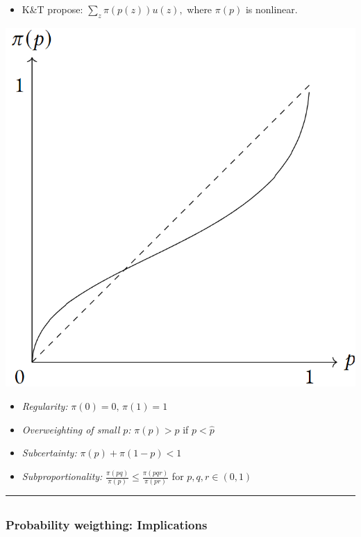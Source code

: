 \documentclass[
  letterpaper,
  DIV=11,
  numbers=noendperiod]{scrartcl}
\providecommand{\tightlist}{%
  \setlength{\itemsep}{0pt}\setlength{\parskip}{0pt}}\usepackage{longtable,booktabs,array}
\begin{document}
\begin{itemize}
\tightlist
\item
  K\&T propose: \(\sum_z\pi(p(z))u(z),\) where \(\pi(p)\) is nonlinear.
\end{itemize}

\includegraphics[width=0.85\linewidth,height=\textheight,keepaspectratio]{figures/WeightingFunction.png}

\begin{itemize}
\tightlist
\item
  \emph{Regularity:} \(\scriptstyle \pi(0) = 0,\,\pi(1) = 1\)
\item
  \emph{Overweighting of small \(p\):} \(\pi(p)>p\) if \(p < \hat{p}\)
\item
  \emph{Subcertainty:} \(\scriptstyle \pi(p) + \pi(1-p) < 1\)
\item
  \emph{Subproportionality:}
  \(\scriptstyle\frac{\pi(pq)}{\pi(p)} \leq \frac{\pi(pqr)}{\pi(pr)}\)
  for \(\scriptstyle p,q,r\in(0,1)\)
\end{itemize}

\begin{center}\rule{0.5\linewidth}{0.5pt}\end{center}

\subsection{}\label{section}

\subsubsection{Probability weigthing:
Implications}\label{probability-weigthing-implications}
\end{document}
